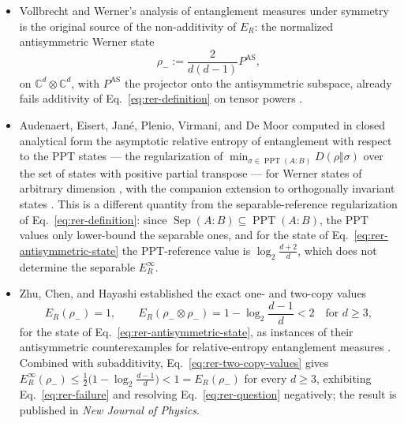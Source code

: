 \begin{itemize}
  \item Vollbrecht and Werner's analysis of entanglement measures under symmetry is
the original source of the non-additivity of $E_R$: the normalized
antisymmetric Werner state
\begin{equation}
  \rho_-:=\frac{2}{d(d-1)}P^{\mathrm{AS}},
  \label{eq:rer-antisymmetric-state}
\end{equation}
on $\mathbb C^d\otimes\mathbb C^d$, with $P^{\mathrm{AS}}$ the projector onto
the antisymmetric subspace, already fails additivity of
Eq.~\eqref{eq:rer-definition} on tensor powers
.

  \item Audenaert, Eisert, Jan\'e, Plenio, Virmani, and De Moor computed in closed
analytical form the asymptotic relative entropy of entanglement with respect
to the PPT states --- the regularization of
$\min_{\sigma\in\operatorname{PPT}(A{:}B)}D(\rho\Vert\sigma)$ over the set of
states with positive partial transpose --- for Werner states of arbitrary
dimension , with the companion extension
to orthogonally invariant states
.  This is a different
quantity from the separable-reference regularization of
Eq.~\eqref{eq:rer-definition}: since
$\operatorname{Sep}(A{:}B)\subseteq\operatorname{PPT}(A{:}B)$, the PPT values
only lower-bound the separable ones, and for the state of
Eq.~\eqref{eq:rer-antisymmetric-state} the PPT-reference value is
$\log_2\frac{d+2}{d}$, which does not determine the separable $E_R^\infty$.

  \item Zhu, Chen, and Hayashi established the exact one- and two-copy values
\begin{equation}
  E_R(\rho_-)=1,
  \qquad
  E_R(\rho_-\otimes\rho_-)=1-\log_2\frac{d-1}{d}<2
  \quad\text{for }d\geq3,
  \label{eq:rer-two-copy-values}
\end{equation}
for the state of Eq.~\eqref{eq:rer-antisymmetric-state}, as instances of
their antisymmetric counterexamples for relative-entropy entanglement
measures .  Combined with
subadditivity, Eq.~\eqref{eq:rer-two-copy-values} gives
$E_R^\infty(\rho_-)\leq\frac12\bigl(1-\log_2\frac{d-1}{d}\bigr)<1=E_R(\rho_-)$
for every $d\geq3$, exhibiting Eq.~\eqref{eq:rer-failure} and resolving
Eq.~\eqref{eq:rer-question} negatively; the result is published in
\emph{New Journal of Physics}.


\end{itemize}
